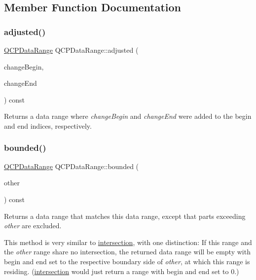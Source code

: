 \subsection{Member Function Documentation}
\mbox{\label{class_q_c_p_data_range_a279ed36602b39607699dc5652bcaf813}} 
\subsubsection{\texorpdfstring{adjusted()}{adjusted()}}
{\footnotesize\ttfamily \hyperlink{class_q_c_p_data_range}{Q\+C\+P\+Data\+Range} Q\+C\+P\+Data\+Range\+::adjusted (\begin{DoxyParamCaption}\item[{int}]{change\+Begin,  }\item[{int}]{change\+End }\end{DoxyParamCaption}) const\hspace{0.3cm}{\ttfamily [inline]}}

Returns a data range where {\itshape change\+Begin} and {\itshape change\+End} were added to the begin and end indices, respectively. \mbox{\label{class_q_c_p_data_range_a93529421d12fdd3a8bdb2b8061936352}} 
\subsubsection{\texorpdfstring{bounded()}{bounded()}}
{\footnotesize\ttfamily \hyperlink{class_q_c_p_data_range}{Q\+C\+P\+Data\+Range} Q\+C\+P\+Data\+Range\+::bounded (\begin{DoxyParamCaption}\item[{const \hyperlink{class_q_c_p_data_range}{Q\+C\+P\+Data\+Range} \&}]{other }\end{DoxyParamCaption}) const}

Returns a data range that matches this data range, except that parts exceeding {\itshape other} are excluded.

This method is very similar to \hyperlink{class_q_c_p_data_range_a84e1e03129dd52528efb4bac18d30183}{intersection}, with one distinction\+: If this range and the {\itshape other} range share no intersection, the returned data range will be empty with begin and end set to the respective boundary side of {\itshape other}, at which this range is residing. (\hyperlink{class_q_c_p_data_range_a84e1e03129dd52528efb4bac18d30183}{intersection} would just return a range with begin and end set to 0.) \mbox{\label{class_q_c_p_data_range_a13ca398776374a3160aa85433718b812}} 
